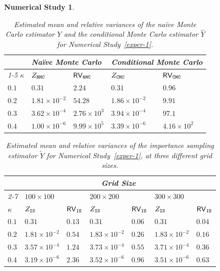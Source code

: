 \documentclass[pdflatex, sn-mathphys-ay]{sn-jnl}%
\newcommand{\wt}{\widetilde}
\newcommand{\wh}{\widehat}
\newtheorem{experiment}{Numerical Study}
\theoremstyle{thmstyleone}%
\theoremstyle{thmstyletwo}%
\theoremstyle{thmstylethree}%
\begin{document}
\begin{experiment}
\renewcommand{\thetable}{\arabic{table}a}
\begin{table}[h]
\caption{Estimated mean and relative variances of the na\"{i}ve Monte Carlo estimator $Y$ and the conditional Monte Carlo estimator $\wh Y$ for Numerical Study~\ref{exper-1}.}
\centering
\label{tab:relVar_NMC_CMC}
\begin{tabular}{@{}lllll@{}}
    \hline
     & \multicolumn{2}{l}{Na\"{i}ve Monte Carlo}
            & \multicolumn{2}{l}{Conditional Monte Carlo}\\
    \cmidrule{1-5}
    $\kappa$    &  $Z_{\tt NMC}$ &   ${\sf RV}_{\tt NMC}$   &   $Z_{\tt CMC}$  &   ${\sf RV}_{\tt CMC}$  \\   
    \hline
$0.1$   &   $0.31$  &   $2.24$  &  $0.31$  &   $0.96$ \\
    \hline
$0.2$   &   $1.81\times 10^{-2}$  &   $54.28$  &   $1.86\times 10^{-2}$  &   $9.91$  \\
    \hline
$0.3$  &   $3.62\times 10^{-4}$    &   $2.76\times 10^{3}$    &  $3.94\times 10^{-4}$     &  $97.1$ \\
    \hline
$0.4$  &   $1.00\times 10^{-6}$    &   $9.99\times 10^{5}$    &  $3.39\times 10^{-6}$     &  $4.16\times 10^{2}$  \\
    \hline
\end{tabular}
\end{table}
\addtocounter{table}{-1}
\renewcommand{\thetable}{\arabic{table}b}
\begin{table}[h]
\caption{Estimated mean and relative variances of the importance sampling estimator $\wt Y$ for Numerical Study~\ref{exper-1}, at three different grid sizes.
}
\label{tab:relVar_ISMC}
\centering
\begin{tabular}{@{}lllllll@{}}
\hline
 & \multicolumn{6}{c}{Grid Size}\\
    \cmidrule{2-7}
	   & \multicolumn{2}{l}{$100\times 100$}
            & \multicolumn{2}{l}{$200\times 200$}
                    & \multicolumn{2}{l}{$300 \times 300$}\\
    \hline 
      $\kappa$          &  $Z_{\tt IS}$  &  ${\sf RV}_{\tt IS}$   &   $Z_{\tt IS}$  &  ${\sf RV}_{\tt IS}$  &   $Z_{\tt IS}$  &  ${\sf RV}_{\tt IS}$       \\                   
    \hline
$ 0.1$   &   $0.31$  &   $0.13$  &  $0.31$  &   $0.06$ &   $0.31$  &   $0.04$    \\
    \hline
$0.2$   &   $1.81\times 10^{-2}$  &   $0.54$  &   $1.83\times 10^{-2}$  &   $0.26$  &   $1.83\times 10^{-2}$  &   $0.16$      \\
    \hline
$0.3$  &   $3.57\times 10^{-4}$    &   $1.24$    &  $3.73\times 10^{-4}$     &  $0.55$     &  $3.71\times 10^{-4}$     &  $0.36$        \\
    \hline
$0.4$  &   $3.19\times 10^{-6}$    &   $2.36$    &  $3.52\times 10^{-6}$     &  $0.96$     &  $3.51\times 10^{-6}$     &  $0.63$        \\
    \hline
\end{tabular}
\end{table}
\renewcommand{\thetable}{\arabic{table}}
\end{experiment}
\end{document}
